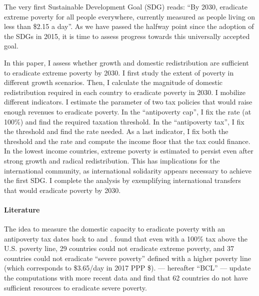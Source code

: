 The very first Sustainable Development Goal (SDG) %
reads: ``By 2030, eradicate extreme poverty for all people everywhere, currently measured as people living on less than \$2.15 a day''. As we have passed the halfway point since the adoption of the SDGs in 2015, it is time to assess progress towards this universally accepted goal. 

In this paper, I assess whether growth and domestic redistribution are sufficient to eradicate extreme poverty by 2030. I first study the extent of poverty in different growth scenarios. Then, I calculate the magnitude of domestic redistribution required in each country to eradicate poverty in 2030. I mobilize different indicators. I estimate the parameter of two tax policies that would raise enough revenues to eradicate poverty. In the ``antipoverty cap'', I fix the rate (at 100\%) and find the required taxation threshold. In the ``antipoverty tax'', I fix the threshold and find the rate needed. As a last indicator, I fix both the threshold and the rate and compute the income floor that the tax could finance. In the lowest income countries, extreme poverty is estimated to persist even after strong growth and radical redistribution. %
This has implications for the international community, as international solidarity appears necessary to achieve the first SDG. I complete the analysis by exemplifying international transfers that would eradicate poverty by 2030.

\paragraph{Literature} 

The idea to measure the domestic capacity to eradicate poverty with an antipoverty tax dates back to \cite{ravallion_poorer_2010} and \cite{ceriani_income_2014}. \cite{ravallion_poorer_2010} found that even with a 100\% tax above the U.S. poverty line, 29 countries could not eradicate extreme poverty, and 37 countries could not eradicate ``severe poverty'' defined with a higher poverty line (which corresponds to \$3.65/day in 2017 PPP \$). %
\cite{bolch_arithmetics_2022} --- hereafter ``BCL'' --- update the computations with more recent data and find that 62 countries do not have sufficient resources to eradicate severe poverty. %

